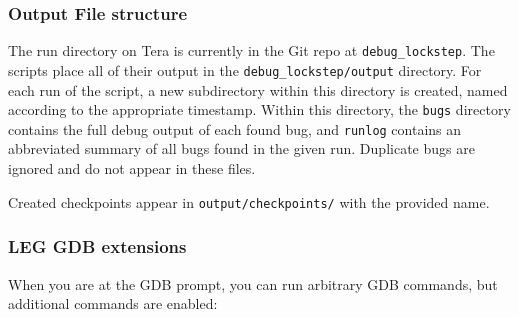 \subsubsection{Output File structure}
The run directory on Tera is currently in the Git repo at \texttt{debug\_lockstep}. The scripts place all of their output in the \texttt{debug\_lockstep/output} directory. For each run of the script, a new subdirectory within this directory is created, named according to the appropriate timestamp. Within this directory, the \texttt{bugs} directory contains the full debug output of each found bug, and \texttt{runlog} contains an abbreviated summary of all bugs found in the given run. Duplicate bugs are ignored and do not appear in these files.

Created checkpoints appear in \texttt{output/checkpoints/} with the provided name.


\subsubsection{LEG GDB extensions}\label{sec:leggdb}

When you are at the GDB prompt, you can run arbitrary GDB commands, but additional commands are enabled:

